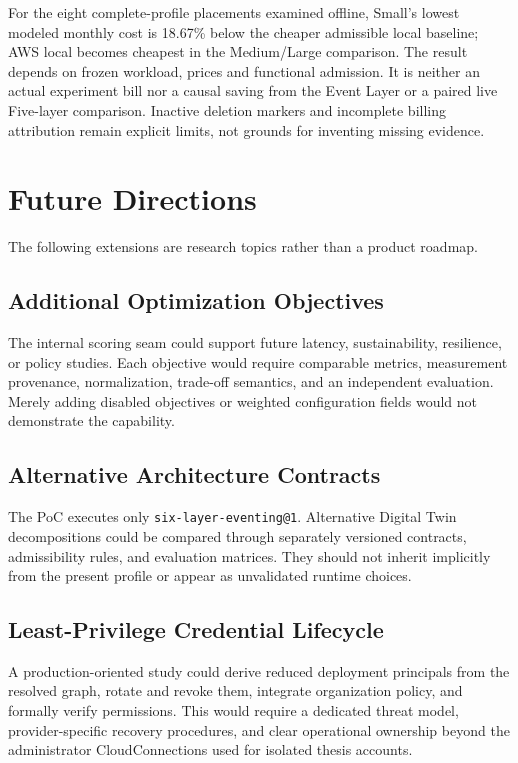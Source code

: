 For the eight complete-profile placements examined offline, Small's lowest
modeled monthly cost is 18.67\% below the cheaper admissible local baseline;
AWS local becomes cheapest in the Medium/Large comparison. The result depends
on frozen workload, prices and functional admission. It is neither an actual
experiment bill nor a causal saving from the Event Layer or a paired live
Five-layer comparison. Inactive deletion markers and incomplete billing
attribution remain explicit limits, not grounds for inventing missing evidence.

\section{Future Directions}
\label{sec:future-work}

The following extensions are research topics rather than a product roadmap.

\subsection{Additional Optimization Objectives}

The internal scoring seam could support future latency, sustainability,
resilience, or policy studies. Each objective would require comparable metrics,
measurement provenance, normalization, trade-off semantics, and an independent
evaluation. Merely adding disabled objectives or weighted configuration fields
would not demonstrate the capability.

\subsection{Alternative Architecture Contracts}

The PoC executes only \texttt{six-layer-eventing@1}. Alternative Digital Twin
decompositions could be compared through separately versioned contracts,
admissibility rules, and evaluation matrices. They should not inherit
implicitly from the present profile or appear as unvalidated runtime choices.

\subsection{Least-Privilege Credential Lifecycle}

A production-oriented study could derive reduced deployment principals from
the resolved graph, rotate and revoke them, integrate organization policy, and
formally verify permissions. This would require a dedicated threat model,
provider-specific recovery procedures, and clear operational ownership beyond
the administrator CloudConnections used for isolated thesis accounts.


